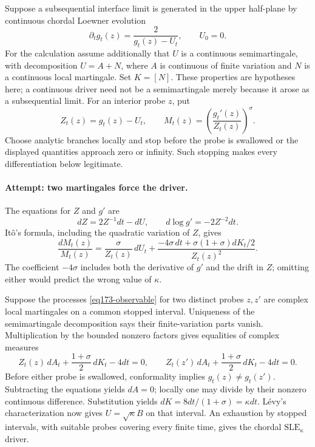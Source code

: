 \documentclass[11pt,a4paper]{article}
\numberwithin{equation}{section}
\begin{document}
Suppose a subsequential interface limit is generated in the upper half-plane
by continuous chordal Loewner evolution
\[
 \partial_tg_t(z)=\frac2{g_t(z)-U_t},\qquad U_0=0.
\]
For the calculation assume additionally that $U$ is a continuous
semimartingale, with decomposition $U=A+N$, where $A$ is continuous of
finite variation and $N$ is a continuous local martingale. Set $K=[N]$.
These properties are hypotheses here; a continuous driver need not be a
semimartingale merely because it arose as a subsequential limit.
For an interior probe $z$, put
\begin{equation}\label{eq173-observable}
 Z_t(z)=g_t(z)-U_t,
 \qquad M_t(z)=\left(\frac{g_t'(z)}{Z_t(z)}\right)^\sigma.
\end{equation}
Choose analytic branches locally and stop before the probe is swallowed
or the displayed quantities approach zero or infinity. Such stopping
makes every differentiation below legitimate.

\paragraph{Attempt: two martingales force the driver.}
The equations for $Z$ and $g'$ are
\[
 dZ=2Z^{-1}dt-dU,\qquad d\log g'=-2Z^{-2}dt.
\]
It\^o's formula, including the quadratic variation of $Z$, gives
\begin{equation}\label{eq173-ito}
 \frac{dM_t(z)}{M_t(z)}
 =\frac{\sigma}{Z_t(z)}\,dU_t
  +\frac{-4\sigma\,dt+\sigma(1+\sigma)dK_t/2}{Z_t(z)^2}.
\end{equation}
The coefficient $-4\sigma$ includes both the derivative of $g'$ and the
drift in $Z$; omitting either would predict the wrong value of $\kappa$.

Suppose the processes \eqref{eq173-observable} for two distinct probes
$z,z'$ are complex local martingales on a common stopped interval. Uniqueness
of the semimartingale decomposition says their finite-variation parts
vanish. Multiplication by the bounded nonzero factors gives equalities of
complex measures
\begin{equation}\label{eq173-measures}
 Z_t(z)\,dA_t+\frac{1+\sigma}{2}\,dK_t-4dt=0,
 \qquad
 Z_t(z')\,dA_t+\frac{1+\sigma}{2}\,dK_t-4dt=0.
\end{equation}
Before either probe is swallowed, conformality implies
$g_t(z)\ne g_t(z')$. Subtracting the equations yields $dA=0$; locally
one may divide by their nonzero continuous difference. Substitution yields
$dK=8dt/(1+\sigma)=\kappa dt$. L\'evy's characterization now gives
$U=\sqrt\kappa B$ on that interval. An exhaustion by stopped intervals,
with suitable probes covering every finite time, gives the chordal
$\mathrm{SLE}_\kappa$ driver.
\end{document}
